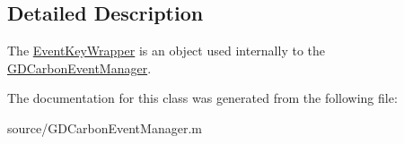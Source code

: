 \subsection{Detailed Description}
The \hyperlink{interface_event_key_wrapper}{EventKeyWrapper} is an object used internally to the \hyperlink{interface_g_d_carbon_event_manager}{GDCarbonEventManager}. 

The documentation for this class was generated from the following file:\begin{DoxyCompactItemize}
\item 
source/GDCarbonEventManager.m\end{DoxyCompactItemize}
